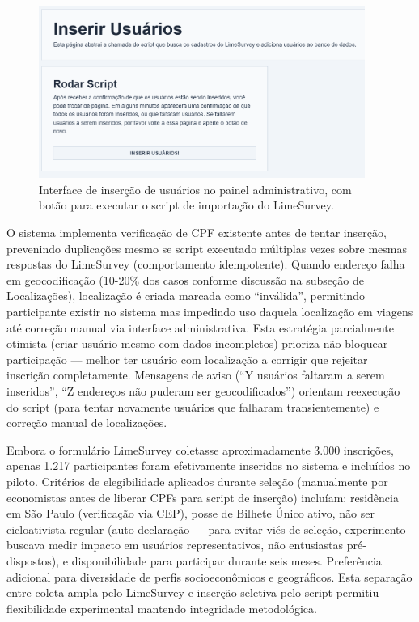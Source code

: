 \begin{figure}[htb]
  \centering
  \includegraphics[width=0.95\textwidth]{figuras/inserir_usuarios.PNG}
  \caption{Interface de inserção de usuários no painel administrativo, com botão para executar o script de importação do LimeSurvey.}
  \label{fig:insercao_usuarios}
\end{figure}

O sistema implementa verificação de CPF existente antes de tentar inserção, prevenindo duplicações mesmo se script executado múltiplas vezes sobre mesmas respostas do LimeSurvey (comportamento idempotente). Quando endereço falha em geocodificação (10-20\% dos casos conforme discussão na subseção de Localizações), localização é criada marcada como ``inválida'', permitindo participante existir no sistema mas impedindo uso daquela localização em viagens até correção manual via interface administrativa. Esta estratégia parcialmente otimista (criar usuário mesmo com dados incompletos) prioriza não bloquear participação --- melhor ter usuário com localização a corrigir que rejeitar inscrição completamente. Mensagens de aviso (``Y usuários faltaram a serem inseridos'', ``Z endereços não puderam ser geocodificados'') orientam reexecução do script (para tentar novamente usuários que falharam transientemente) e correção manual de localizações.

Embora o formulário LimeSurvey coletasse aproximadamente 3.000 inscrições, apenas 1.217 participantes foram efetivamente inseridos no sistema e incluídos no piloto. Critérios de elegibilidade aplicados durante seleção (manualmente por economistas antes de liberar CPFs para script de inserção) incluíam: residência em São Paulo (verificação via CEP), posse de Bilhete Único ativo, não ser cicloativista regular (auto-declaração --- para evitar viés de seleção, experimento buscava medir impacto em usuários representativos, não entusiastas pré-dispostos), e disponibilidade para participar durante seis meses. Preferência adicional para diversidade de perfis socioeconômicos e geográficos. Esta separação entre coleta ampla pelo LimeSurvey e inserção seletiva pelo script permitiu flexibilidade experimental mantendo integridade metodológica.

